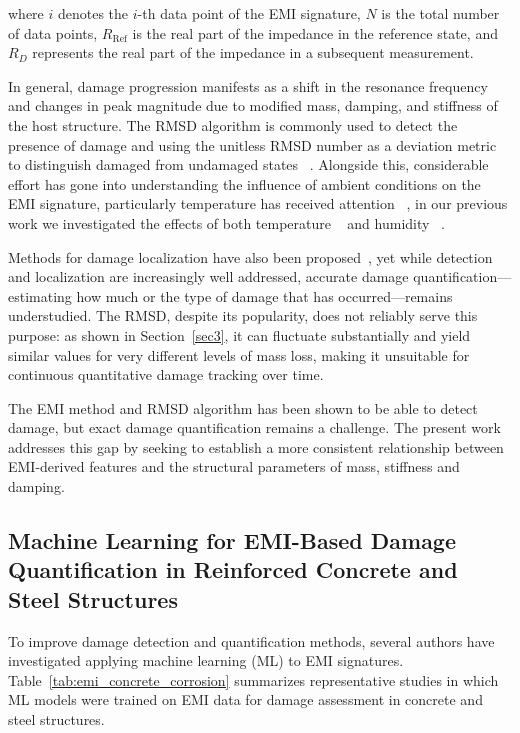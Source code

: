 \documentclass[journal,twoside,web]{ieeecolor}
\begin{document}
where $i$ denotes the $i$-th data point of the EMI signature, $N$ is the total number of data points, $R_{\mathrm{Ref}}$ is the real part of the impedance in the reference state, and $R_D$ represents the real part of the impedance in a subsequent measurement.

In general, damage progression manifests as a shift in the resonance frequency and changes in peak magnitude due to modified mass, damping, and stiffness of the host structure. The RMSD algorithm is commonly used to detect the presence of damage and using the unitless RMSD number as a deviation metric to distinguish damaged from undamaged states ~\cite{NA_res_dmg}. Alongside this, considerable effort has gone into understanding the influence of ambient conditions on the EMI signature, particularly temperature has received attention ~\cite{park1999temperature, shelgaonkar2025_thermal_emi_shm}, in our previous work we investigated the effects of both temperature ~\cite{Dahl_multi_model} and humidity ~\cite{Dahl_humid}. 

Methods for damage localization have also been proposed~\cite{ZHU2021107001, pereira2024damage, djemana2017}, yet while detection and localization are increasingly well addressed, accurate damage quantification—estimating how much or the type of damage that has occurred—remains understudied. The RMSD, despite its popularity, does not reliably serve this purpose: as shown in Section~\ref{sec3}, it can fluctuate substantially and yield similar values for very different levels of mass loss, making it unsuitable for continuous quantitative damage tracking over time.

The EMI method and RMSD algorithm has been shown to be able to detect damage, but exact damage quantification remains a challenge. The present work addresses this gap by seeking to establish a more consistent relationship between EMI-derived features and the structural parameters of mass, stiffness and damping.


\subsection{Machine Learning for EMI-Based Damage Quantification in Reinforced Concrete and Steel Structures}

To improve damage detection and quantification methods, several authors have investigated applying machine learning (ML) to EMI signatures. Table~\ref{tab:emi_concrete_corrosion} summarizes representative studies in which ML models were trained on EMI data for damage assessment in concrete and steel structures.
\end{document}
